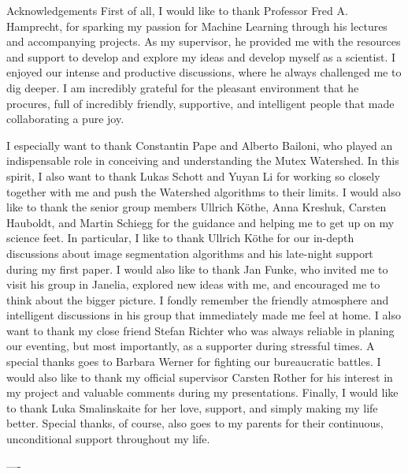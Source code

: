 
\begin{coverpage}{Acknowledgements}
First of all, I would like to thank Professor Fred A. Hamprecht, for sparking my passion for Machine Learning through his lectures and accompanying projects. 
As my supervisor, he provided me with the resources and support to develop and explore my ideas and develop myself as a scientist. I enjoyed our intense and productive discussions, where he always challenged me to dig deeper. I am incredibly grateful for the pleasant environment that he procures, full of incredibly friendly, supportive, and intelligent people that made collaborating a pure joy. 

I especially want to thank Constantin Pape and Alberto Bailoni, who played an indispensable role in conceiving and understanding the Mutex Watershed. In this spirit, I also want to thank Lukas Schott and Yuyan Li for working so closely together with me and push the Watershed algorithms to their limits. I would also like to thank the senior group members Ullrich Köthe, Anna Kreshuk, Carsten Hauboldt, and Martin Schiegg for the guidance and helping me to get up on my science feet. In particular, I like to thank Ullrich Köthe for our in-depth discussions about image segmentation algorithms and his late-night support during my first paper.
I would also like to thank Jan Funke, who invited me to visit his group in Janelia, explored new ideas with me, and encouraged me to think about the bigger picture. I fondly remember the friendly atmosphere and intelligent discussions in his group that immediately made me feel at home. I also want to thank my close friend Stefan Richter who was always reliable in planing our eventing, but most importantly, as a supporter during stressful times. A special thanks goes to Barbara Werner for fighting our bureaucratic battles. I would also like to thank my official supervisor Carsten Rother for his interest in my project and valuable comments during my presentations.
Finally, I would like to thank Luka Smalinskaite for her love, support, and simply making my life better. Special thanks, of course, also goes to my parents for their continuous, unconditional support throughout my life.


----


\end{coverpage}
